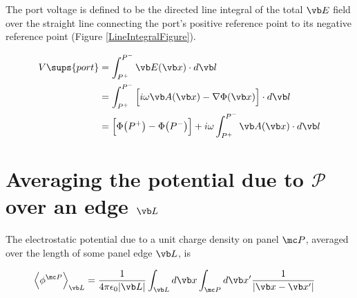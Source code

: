 \documentclass[letterpaper]{article}
\begin{document}
\label{PortVoltageSection}

The port voltage is defined to be the directed line integral 
of the total $\vb E$ field over the straight line connecting
the port's positive reference point to its negative reference
point (Figure \ref{LineIntegralFigure}).

\begin{align*}
  V\sups{port}
&=\int_{P^+}^{P^-} \vb E(\vb x) \cdot d \vb l 
\\
&=\int_{P^+}^{P^-} \Big[ i\omega \vb A(\vb x) - \nabla \Phi(\vb x)\Big]
                   \cdot d \vb l
\\
&= \Big[ \Phi\big(P^+\big) - \Phi\big(P^-\big)\Big]
   +i\omega \int_{P^+}^{P^-} \vb A(\vb x) \cdot d\vb l
\end{align*}

\section*{Averaging the potential due to $\mathcal{P}$ over an edge $\vb L$}

The electrostatic potential due to a unit charge density on panel $\mc P$,
averaged over the length of some panel edge $\vb L$, is 

\begin{align*}
 \Big\langle \phi^{\mc P} \Big \rangle_{\vb L}
&= \frac{1}{4\pi \epsilon_0 |\vb L|}\int_{\vb L} d\vb x \int_{\mc P} d\vb x^\prime 
   \frac{1}{|\vb x - \vb x^\prime|} 
\end{align*}
\end{document}
